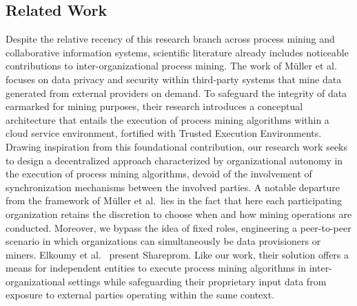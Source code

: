 \subsection{Related Work}
Despite the relative recency of this research branch across process mining and collaborative information systems, scientific literature already includes noticeable contributions to inter-organizational process mining. %
The work of M{\"u}ller et al.~\citep{muller2021process} focuses on data privacy and security within third-party systems that mine data generated from external providers on demand. To safeguard the integrity of data earmarked for mining purposes, their research introduces a conceptual architecture that entails the execution of process mining algorithms within a cloud service environment, fortified with Trusted Execution Environments. %
Drawing inspiration from this foundational contribution, our research work seeks to design a decentralized approach characterized by organizational autonomy in the execution of process mining algorithms, devoid of the involvement of synchronization mechanisms between the involved parties. A notable departure from the framework of M{\"u}ller et al.\ lies in the fact that here %
each participating organization retains the discretion to choose when and how mining operations are conducted. Moreover, we bypass the idea of fixed roles, engineering a peer-to-peer scenario in which organizations can simultaneously be data provisioners or miners.
Elkoumy et al.~\citep{elkoumy2020shareprom,elkoumy2020secure} present Shareprom. Like our work, their solution offers a means for independent entities to execute process mining algorithms in inter-organizational settings while safeguarding their proprietary input data from exposure to external parties operating within the same context.
